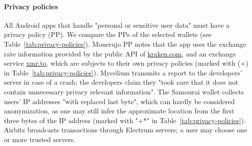 \paragraph{Privacy policies}
All Android apps that handle "personal or sensitive user data" must have a privacy policy (PP).
We compare the PPs of the selected wallets (see Table~\ref{tab:privacy-policies}).
Monerujo PP notes that the app uses the exchange rate information provided by the public API of \url{kraken.com}, and an exchange service \url{xmr.to}, which are subjects to their own privacy policies (marked with (+) in Table~\ref{tab:privacy-policies}).
Mycelium transmits a report to the developers' server in case of a crash; the developers claim they "took care that it does not contain unnecessary privacy relevant information".
The Samourai wallet collects users' IP addresses "with replaced last byte", which can hardly be considered anonymization, as one may still infer the approximate location from the first three bytes of the IP address (marked with "+*" in Table~\ref{tab:privacy-policies}).
Airbitz broadcasts transactions through Electrum servers; a user may choose one or more trusted servers.

